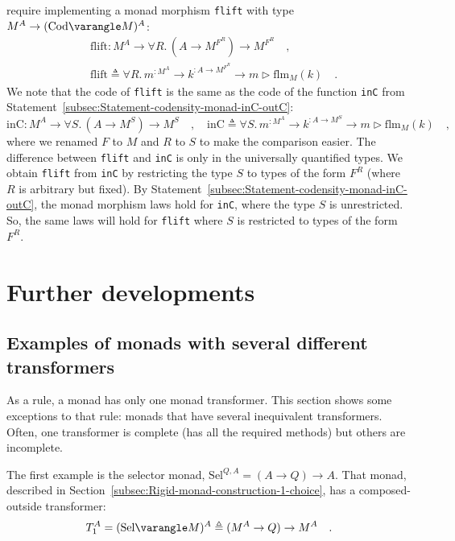 require implementing a monad morphism \lstinline!flift! with type
$M^{A}\rightarrow(\text{Cod}\varangle M)^{A}$:
\begin{align*}
 & \text{flift}:M^{A}\rightarrow\forall R.\,(A\rightarrow M^{F^{R}})\rightarrow M^{F^{R}}\quad,\\
 & \text{flift}\triangleq\forall R.\,m^{:M^{A}}\rightarrow k^{:A\rightarrow M^{F^{R}}}\rightarrow m\triangleright\text{flm}_{M}(k)\quad.
\end{align*}
We note that the code of \lstinline!flift! is the same as the code
of the function \lstinline!inC! from Statement~\ref{subsec:Statement-codensity-monad-inC-outC}:
\[
\text{inC}:M^{A}\rightarrow\forall S.\,(A\rightarrow M^{S})\rightarrow M^{S}\quad,\quad\text{inC}\triangleq\forall S.\,m^{:M^{A}}\rightarrow k^{:A\rightarrow M^{S}}\rightarrow m\triangleright\text{flm}_{M}(k)\quad,
\]
where we renamed $F$ to $M$ and $R$ to $S$ to make the comparison
easier. The difference between \lstinline!flift! and \lstinline!inC!
is only in the universally quantified types. We obtain \lstinline!flift!
from \lstinline!inC! by restricting the type $S$ to types of the
form $F^{R}$ (where $R$ is arbitrary but fixed). By Statement~\ref{subsec:Statement-codensity-monad-inC-outC},
the monad morphism laws hold for \lstinline!inC!, where the type
$S$ is unrestricted. So, the same laws will hold for \lstinline!flift!
where $S$ is restricted to types of the form $F^{R}$.

\section{Further developments}

\subsection{Examples of monads with several different transformers\label{subsec:Examples-of-monads-with-two-different-transformers}}

As a rule, a monad has only one monad transformer. This section shows
some exceptions to that rule: monads that have several inequivalent
transformers. Often, one transformer is complete (has all the required
methods) but others are incomplete.

The first example is the selector monad,
$\text{Sel}^{Q,A}=(A\rightarrow Q)\rightarrow A$. That monad, described
in Section~\ref{subsec:Rigid-monad-construction-1-choice}, has a
composed-outside transformer: 
\[
T_{1}^{A}=(\text{Sel}\varangle M)^{A}\triangleq(M^{A}\rightarrow Q)\rightarrow M^{A}\quad.
\]

